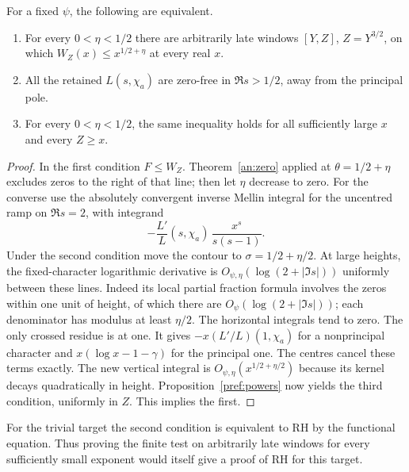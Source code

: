 \begin{corollary}\label{pref:zeros}
For a fixed \(\psi\), the following are equivalent.
\begin{enumerate}
\item For every \(0<\eta<1/2\) there are arbitrarily late windows
\([Y,Z]\), \(Z=Y^{3/2}\), on which \(W_Z(x)\le x^{1/2+\eta}\)
at every real \(x\).
\item All the retained \(L(s,\chi_a)\) are zero-free in
\(\Re s>1/2\), away from the principal pole.
\item For every \(0<\eta<1/2\), the same inequality holds for all
sufficiently large \(x\) and every \(Z\ge x\).
\end{enumerate}
\end{corollary}
\begin{proof}
In the first condition \(F\le W_Z\). Theorem~\ref{an:zero} applied
at \(\theta=1/2+\eta\) excludes zeros to the right of that line;
then let \(\eta\) decrease to zero. For the converse use the
absolutely convergent inverse Mellin integral for the uncentred ramp
on \(\Re s=2\), with integrand
\[
        -\frac{L'}{L}(s,\chi_a)\,\frac{x^s}{s(s-1)} .
\]
Under the second condition move the contour to
\(\sigma=1/2+\eta/2\). At large heights, the fixed-character
logarithmic derivative is \(O_{\psi,\eta}(\log(2+|\Im s|))\)
uniformly between these lines. Indeed its local partial fraction
formula involves the zeros within one unit of height, of which
there are \(O_\psi(\log(2+|\Im s|))\); each denominator has modulus
at least \(\eta/2\). The horizontal integrals tend to zero.
The only crossed residue is at one. It gives
\(-x(L'/L)(1,\chi_a)\) for a nonprincipal character and
\(x(\log x-1-\gamma)\) for the principal one.
The centres cancel these terms exactly. The new vertical integral
is \(O_{\psi,\eta}(x^{1/2+\eta/2})\) because its kernel decays
quadratically in height. Proposition~\ref{pref:powers} now yields
the third condition, uniformly in \(Z\). This implies the first.
\end{proof}
For the trivial target the second condition is equivalent to RH by
the functional equation. Thus proving the finite test on arbitrarily
late windows for every sufficiently small exponent would itself give
a proof of RH for this target.

